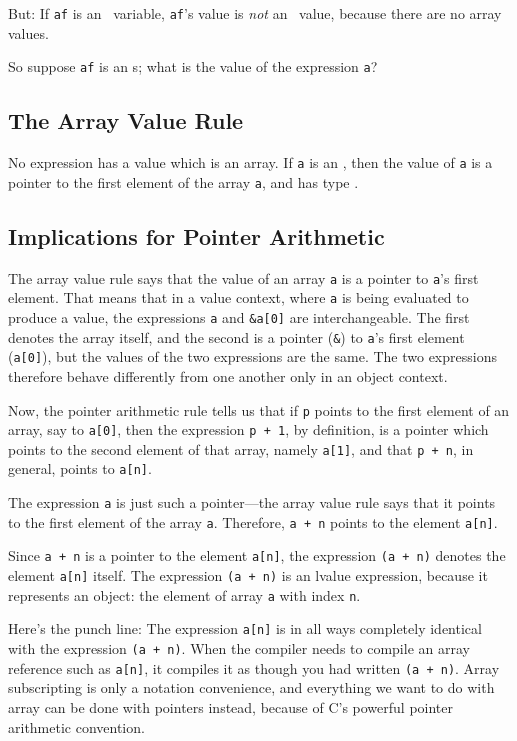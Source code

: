 But: If {\tt af} is an \ao\Float\ variable, {\tt af}'s value is {\em
not}\/ an \ao\Float\ value, because there are no array values.

So suppose {\tt af} is an \ao\Float s; what is the value of the
expression {\tt a}?

\subsection{The Array Value Rule}

No expression has a value which is an array.  If {\tt a} is an
, then the value of {\tt a} is a pointer to the first element
of the array {\tt a}, and has type .

\subsection{Implications for Pointer Arithmetic}

The array value rule says that the value of an array {\tt a} is a
pointer to {\tt a}'s first element.  That means that in a value context,
where {\tt a} is being evaluated to produce a value, the expressions
{\tt a} and {\tt\&a[0]} are interchangeable.  The first denotes the
array itself, and the second is a pointer ({\tt \&}) to {\tt a}'s first
element ({\tt a[0]}), but the values of the two expressions are the
same.  The two expressions therefore behave differently from one another
only in an object context.  

Now, the pointer arithmetic rule tells us that if {\tt p} points to the
first element of an array, say to {\tt a[0]}, then the expression {\tt p
+ 1}, by definition, is a pointer which points to the second element of
that array, namely {\tt a[1]}, and that {\tt p + n}, in general, points
to {\tt a[n]}.

The expression {\tt a} is just such a pointer---the array value rule
says that it points to the first element of the array {\tt a}.
Therefore, {\tt a + n} points to the element {\tt a[n]}.  

Since {\tt a + n} is a pointer to the element {\tt a[n]}, the expression
{\tt *(a + n)} denotes the element {\tt a[n]} itself.  The expression
{\tt *(a + n)} is an lvalue expression, because it represents an object:
the element of array {\tt a} with index {\tt n}.

Here's the punch line:  The expression {\tt a[n]} is in all ways
completely identical  with the expression {\tt *(a + n)}.  When the
compiler needs to compile an array reference such as {\tt a[n]}, it
compiles it as though you had written {\tt *(a + n)}.  Array
subscripting is only a notation convenience, and everything we want to
do with array can be done with pointers instead, because of C's powerful
pointer arithmetic convention.

